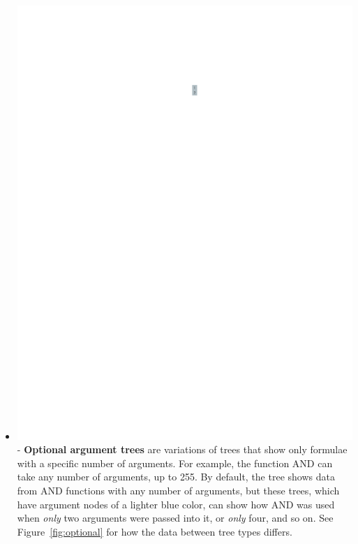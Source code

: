 \documentclass[conference]{IEEEtran}
\begin{document}
\begin{itemize}
		\item  \vspace{.25cm} \includegraphics[scale=.75]{glossary-lightblue} -
		\textbf{Optional argument trees} are variations of trees that show only
		formulae with a specific number of arguments. For example, the function AND
		can take any number of arguments, up to 255. By default, the tree shows data
		from AND functions with any number of arguments, but these trees, which have argument nodes of a lighter blue color, can show how AND was used when \textit{only} two arguments
		were passed into it, or \textit{only} four, and so on. See
		Figure~\ref{fig:optional} for how the data between tree types differs.
	\end{itemize}
	
\end{document}

